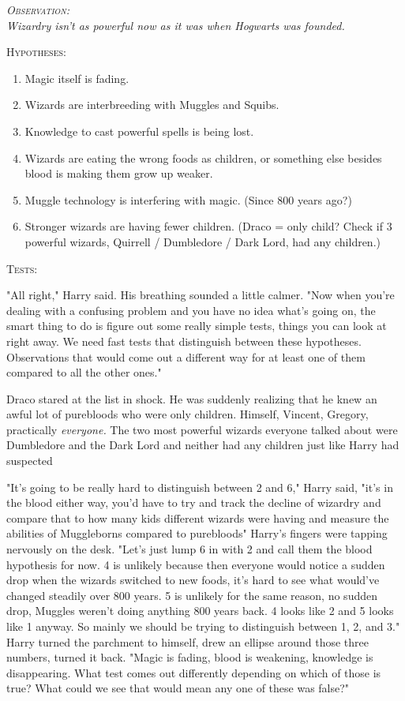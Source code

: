 \begin{center}\itshape
{\scshape Observation:}\\
Wizardry isn't as powerful now as it was when Hogwarts was founded.

{\scshape Hypotheses:}
\begin{enumerate}[1.]\firmlist
\item Magic itself is fading.
\item Wizards are interbreeding with Muggles and Squibs.
\item Knowledge to cast powerful spells is being lost.
\item Wizards are eating the wrong foods as children, or something else besides
blood is making them grow up weaker.
\item Muggle technology is interfering with magic. (Since 800 years ago?)
\item Stronger wizards are having fewer children. (Draco = only child? Check if 3 
powerful wizards, Quirrell / Dumbledore / Dark Lord, had any children.)
\end{enumerate}
{\scshape Tests:}
\end{center}

"All right," Harry said. His breathing sounded a little calmer. "Now when
you're dealing with a confusing problem and you have no idea what's going on,
the smart thing to do is figure out some really simple tests, things you can
look at right away. We need fast tests that distinguish between these
hypotheses. Observations that would come out a different way for at least one
of them compared to all the other ones."

Draco stared at the list in shock. He was suddenly realizing that he knew an
awful lot of purebloods who were only children. Himself, Vincent, Gregory,
practically \emph{everyone.} The two most powerful wizards everyone talked
about were Dumbledore and the Dark Lord and neither had any children just like
Harry had suspected{\el}

"It's going to be really hard to distinguish between 2 and 6," Harry said,
"it's in the blood either way, you'd have to try and track the decline of
wizardry and compare that to how many kids different wizards were having and
measure the abilities of Muggleborns compared to purebloods{\el}" Harry's
fingers were tapping nervously on the desk. "Let's just lump 6 in with 2 and
call them the blood hypothesis for now. 4 is unlikely because then everyone
would notice a sudden drop when the wizards switched to new foods, it's hard to
see what would've changed steadily over 800 years. 5 is unlikely for the same
reason, no sudden drop, Muggles weren't doing anything 800 years back. 4 looks
like 2 and 5 looks like 1 anyway. So mainly we should be trying to distinguish
between 1, 2, and 3." Harry turned the parchment to himself, drew an ellipse
around those three numbers, turned it back. "Magic is fading, blood is
weakening, knowledge is disappearing. What test comes out differently depending
on which of those is true? What could we see that would mean any one of these
was false?"

